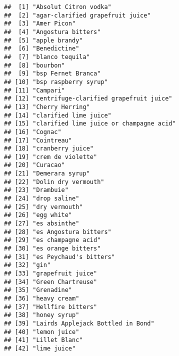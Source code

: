 \documentclass[
]{article}
\newenvironment{Shaded}{\begin{snugshade}}{\end{snugshade}}
\newcommand{\KeywordTok}[1]{\textcolor[rgb]{0.13,0.29,0.53}{\textbf{#1}}}
\newcommand{\NormalTok}[1]{#1}
\newcommand{\OperatorTok}[1]{\textcolor[rgb]{0.81,0.36,0.00}{\textbf{#1}}}
\newcommand{\StringTok}[1]{\textcolor[rgb]{0.31,0.60,0.02}{#1}}
\begin{document}
\begin{Shaded}
\end{Shaded}

\begin{verbatim}
##  [1] "Absolut Citron vodka"                  
##  [2] "agar-clarified grapefruit juice"       
##  [3] "Amer Picon"                            
##  [4] "Angostura bitters"                     
##  [5] "apple brandy"                          
##  [6] "Benedictine"                           
##  [7] "blanco tequila"                        
##  [8] "bourbon"                               
##  [9] "bsp Fernet Branca"                     
## [10] "bsp raspberry syrup"                   
## [11] "Campari"                               
## [12] "centrifuge-clarified grapefruit juice" 
## [13] "Cherry Herring"                        
## [14] "clarified lime juice"                  
## [15] "clarified lime juice or champagne acid"
## [16] "Cognac"                                
## [17] "Cointreau"                             
## [18] "cranberry juice"                       
## [19] "crem de violette"                      
## [20] "Curacao"                               
## [21] "Demerara syrup"                        
## [22] "Dolin dry vermouth"                    
## [23] "Drambuie"                              
## [24] "drop saline"                           
## [25] "dry vermouth"                          
## [26] "egg white"                             
## [27] "es absinthe"                           
## [28] "es Angostura bitters"                  
## [29] "es champagne acid"                     
## [30] "es orange bitters"                     
## [31] "es Peychaud's bitters"                 
## [32] "gin"                                   
## [33] "grapefruit juice"                      
## [34] "Green Chartreuse"                      
## [35] "Grenadine"                             
## [36] "heavy cream"                           
## [37] "Hellfire bitters"                      
## [38] "honey syrup"                           
## [39] "Lairds Applejack Bottled in Bond"      
## [40] "lemon juice"                           
## [41] "Lillet Blanc"                          
## [42] "lime juice"                            

\end{verbatim}
\end{document}
